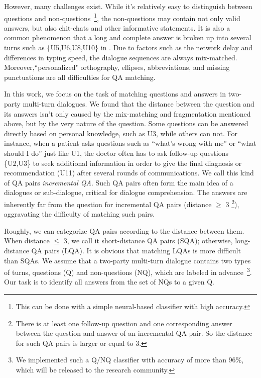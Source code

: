 However, many challenges exist. While it's relatively easy to distinguish
between questions and non-questions~\footnote{This can be done with a simple 
neural-based classifier with high accuracy.},
the non-questions may contain not only valid answers, but also chit-chats and
other informative statements. It is also a common phenomenon that a long and complete answer is broken up into several turns such as \{U5,U6,U8,U10\} in . Due to factors such as the network delay and differences in typing speed, the dialogue sequences are always mix-matched. Moreover,``personalized" orthography, ellipses, abbreviations, and missing punctuations are all difficulties for QA matching.



In this work, we focus on the task of matching questions and answers in two-party 
multi-turn dialogues. We found that the distance between the question and its answers 
isn't only caused by the mix-matching and fragmentation mentioned above, 
but by the very nature of the question. 
Some questions can be answered directly based on personal knowledge, 
such as U3, while others can not. For instance, when a patient asks questions 
such as ``what's wrong with me'' or ``what should I do'' just like U1, the doctor often has to ask follow-up questions \{U2,U3\} to seek additional information in order to give the final diagnosis or recommendation (U11) after several rounds of communications. 
We call this kind of QA pairs {\em incremental QA}. 
Such QA pairs often form the main idea of a dialogues or sub-dialogue, 
critical for dialogue comprehension. The answers are inherently far from the question for incremental QA pairs (distance $\geq$ 3 \footnote{There is at least one follow-up question and one corresponding answer between the question and answer of an incremental QA pair. So the distance for such QA pairs is larger or equal to 3.}), aggravating the difficulty of matching such pairs. 

Roughly, we can categorize QA pairs according to the distance between them. 
When distance $\leq$ 3, we call it short-distance QA pairs (SQA); 
otherwise, long-distance QA pairs (LQA). 
It is obvious that matching LQAs is more difficult than SQAs. 
We assume that a two-party multi-turn dialogue contains two types of turns, 
questions (Q) and non-questions (NQ), 
which are labeled in advance~\footnote{We implemented such a Q/NQ classifier
with accuracy of more than 96\%,
which will be released to the research community.}. 
Our task is to identify all answers from the set of NQs to a given Q. 

